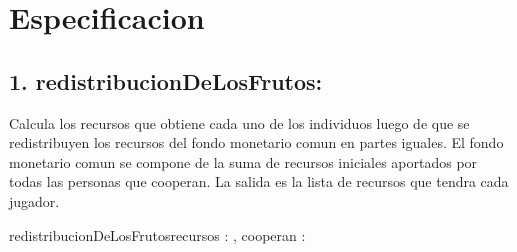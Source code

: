 \documentclass[10pt,a4paper]{article}
\begin{document}
\maketitle

\section{Especificacion}




\subsection*{1. redistribucionDeLosFrutos:}
	Calcula los recursos que obtiene cada uno de los individuos luego de que se redistribuyen
	los recursos del fondo monetario comun en partes iguales. El fondo monetario comun se compone de la suma de recursos
	iniciales aportados por todas las personas que cooperan. La salida es la lista de recursos que tendra cada jugador.

	\begin{proc}{redistribucionDeLosFrutos}{\In recursos : \TLista{\float}, \In cooperan : \TLista{\bool}}{\TLista{\float}}
		\hfill 

		{ 
		}

		\hfill 

		{
		}

		\hfill 
		

		\hfill 


		

	\end{proc}
	
\end{document}
